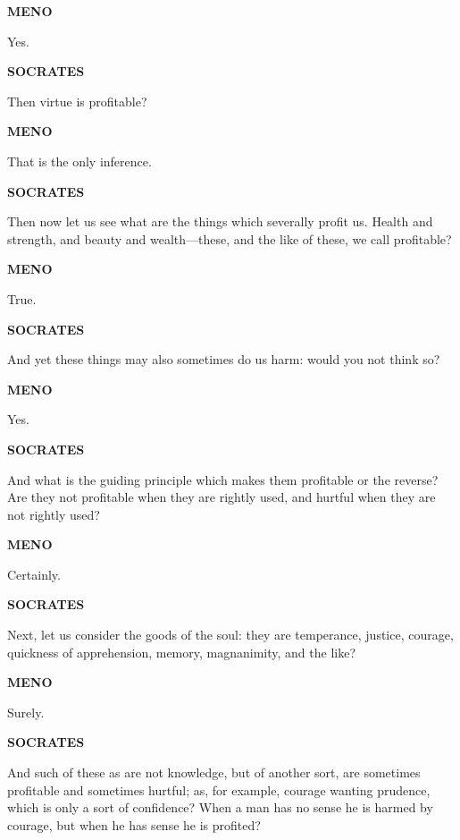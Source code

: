 \documentclass[11pt,letter]{article}
\begin{document}
\par \textbf{MENO}
\par   Yes.

\par \textbf{SOCRATES}
\par   Then virtue is profitable?

\par \textbf{MENO}
\par   That is the only inference.

\par \textbf{SOCRATES}
\par   Then now let us see what are the things which severally profit us. Health and strength, and beauty and wealth—these, and the like of these, we call profitable?

\par \textbf{MENO}
\par   True.

\par \textbf{SOCRATES}
\par   And yet these things may also sometimes do us harm:  would you not think so?

\par \textbf{MENO}
\par   Yes.

\par \textbf{SOCRATES}
\par   And what is the guiding principle which makes them profitable or the reverse? Are they not profitable when they are rightly used, and hurtful when they are not rightly used?

\par \textbf{MENO}
\par   Certainly.

\par \textbf{SOCRATES}
\par   Next, let us consider the goods of the soul:  they are temperance, justice, courage, quickness of apprehension, memory, magnanimity, and the like?

\par \textbf{MENO}
\par   Surely.

\par \textbf{SOCRATES}
\par   And such of these as are not knowledge, but of another sort, are sometimes profitable and sometimes hurtful; as, for example, courage wanting prudence, which is only a sort of confidence? When a man has no sense he is harmed by courage, but when he has sense he is profited?
\end{document}
